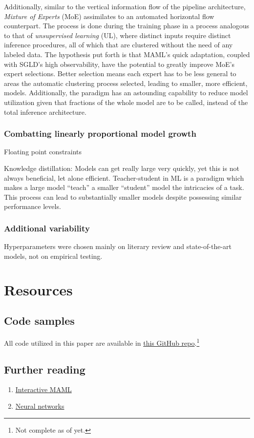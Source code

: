 \documentclass[conference]{IEEEtran}
\begin{document}
Additionally, similar to the vertical information flow of the pipeline architecture, \textit{Mixture of Experts} (MoE) assimilates to an automated horizontal flow counterpart. The process is done during the training phase in a process analogous to that of \textit{unsupervised learning} (UL), where distinct inputs require distinct inference procedures, all of which that are clustered without the need of any labeled data. The hypothesis put forth is that MAML's quick adaptation, coupled with SGLD's high observability, have the potential to greatly improve MoE's expert selections. Better selection means each expert has to be less general to areas the automatic clustering process selected, leading to smaller, more efficient, models. Additionally, the paradigm has an astounding capability to reduce model utilization given that fractions of the whole model are to be called, instead of the total inference architecture.

\subsubsection{Combatting linearly proportional model growth}
Floating point constraints

Knowledge distillation: Models can get really large very quickly, yet this is not always beneficial, let alone efficient. Teacher-student in ML is a paradigm which makes a large model ``teach'' a smaller ``student'' model the intricacies of a task. This process can lead to substantially smaller models despite possessing similar performance levels.

\subsubsection{Additional variability}
Hyperparameters were chosen mainly on literary review and state-of-the-art models, not on empirical testing.

\section{Resources} \label{resources}

\subsection{Code samples}
All code utilized in this paper are available in \href{https://github.com/smgabardo/CV_Efficiency_MetaRobustness}{this GitHub repo}.\footnote{Not complete as of yet.}

\subsection{Further reading}

\begin{enumerate}
    \item \href{https://interactive-maml.github.io/}{Interactive MAML} \cite{interactive_maml}
    \item \href{https://youtube.com/playlist?list=PLZHQObOWTQDNU6R1_67000Dx_ZCJB-3pi}{Neural networks} \cite{3b1b_nn}
\end{enumerate}


\end{document}
